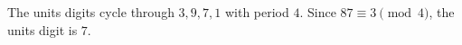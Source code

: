 The units digits cycle through $3,9,7,1$ with period $4$. Since $87\equiv3\pmod4$, the units digit is $\boxed7$.
